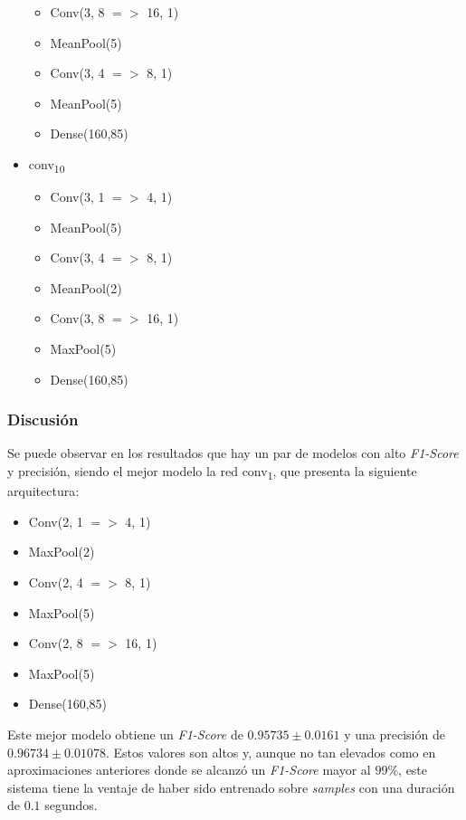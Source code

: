 \documentclass[12pt]{article}
\begin{document}
\begin{itemize}
\begin{itemize}
		\item Conv(3, 8 $=>$ 16, 1)
		\item MeanPool(5)
		\item Conv(3, 4 $=>$ 8, 1)
		\item MeanPool(5)
  		\item Dense(160,85)
	\end{itemize}
	\item conv\textsubscript{10} \begin{itemize}
		\item Conv(3, 1 $=>$ 4, 1)
  		\item MeanPool(5)
		\item Conv(3, 4 $=>$ 8, 1)
		\item MeanPool(2)
		\item Conv(3, 8 $=>$ 16, 1)
		\item MaxPool(5)
  		\item Dense(160,85)
	\end{itemize}
\end{itemize}

\subsubsection{Discusión}

Se puede observar en los resultados que hay un par de modelos con alto \textit{F1-Score} y precisión,
siendo el mejor modelo la red conv\textsubscript{1}, que presenta la siguiente arquitectura:

\begin{itemize}
	\item Conv(2, 1 $=>$ 4, 1)
	\item MaxPool(2)
	\item Conv(2, 4 $=>$ 8, 1)
	\item MaxPool(5)
	\item Conv(2, 8 $=>$ 16, 1)
	\item MaxPool(5)
	\item Dense(160,85)
\end{itemize}

Este mejor modelo obtiene un \textit{F1-Score} de $0.95735 \pm 0.0161$ y una
precisión de  $0.96734 \pm 0.01078$. Estos valores son altos y, aunque no tan elevados como en aproximaciones
anteriores donde se alcanzó un \textit{F1-Score} mayor al $99\%$, este sistema tiene la ventaje de haber sido entrenado sobre 
\textit{samples} con una duración de $0.1$ segundos.
\end{document}
